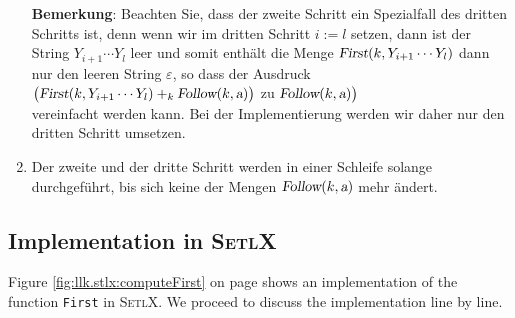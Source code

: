 \begin{enumerate}
      \textbf{Bemerkung}:  Beachten Sie, dass der zweite Schritt ein Spezialfall des
      dritten Schritts ist, denn wenn wir im dritten Schritt $i := l$ setzen, dann ist
      der String $Y_{i+1} \cdots Y_l$ leer und somit enth\"alt die Menge
      $\textsl{First}(k, Y_{i+1}\cdots Y_l)$ dann nur den leeren String $\varepsilon$, so
      dass der Ausdruck
      \\[0.2cm]
      \hspace*{1.3cm}
      $\bigl(\textsl{First}(k, Y_{i+1} \cdots Y_l) +_k \textsl{Follow}(k,\textsl{a})\bigr)$  \quad
      zu \quad $\textsl{Follow}(k,\textsl{a})\bigr)$
      \\[0.2cm]
      vereinfacht werden kann.  Bei der Implementierung werden wir daher nur den dritten
      Schritt umsetzen.
\item Der zweite und der dritte Schritt werden in einer Schleife solange durchgef\"uhrt, bis sich keine
      der Mengen $\textsl{Follow}(k, \textsl{a})$ mehr \"andert.
\end{enumerate}

\subsection{Implementation in \textsc{SetlX}}
Figure \ref{fig:llk.stlx:computeFirst} on page \pageref{fig:llk.stlx:computeFirst} shows an
implementation of the function \texttt{First} in \textsc{SetlX}.  We proceed to discuss the
implementation line by line.




